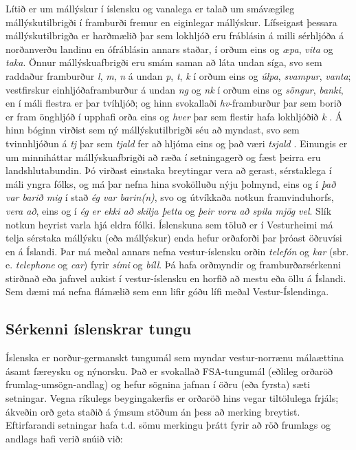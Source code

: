 \documentclass{../../metanetpaper}
\begin{document}
\begin{multicols}{2}
Lítið er um mállýskur í íslensku og vanalega er talað um smávægileg mállýskutilbrigði í framburði fremur en eiginlegar mállýskur. Lífseigast þessara mállýskutilbrigða er harðmælið þar sem lokhljóð eru fráblásin á milli sérhljóða á norðanverðu landinu en ófráblásin annars staðar, í orðum eins og \textit{æpa}, \textit{vita} og \textit{taka}. Önnur mállýskuafbrigði eru smám saman að láta undan síga, svo sem raddaður framburður \textit{l}, \textit{m}, \textit{n} á undan \textit{p}, \textit{t}, \textit{k} í orðum eins og \textit{úlpa}, \textit{svampur}, \textit{vanta};  vestfirskur einhljóðaframburður á undan \textit{ng} og \textit{nk} í orðum eins og \textit{söngur}, \textit{banki}, en í máli flestra er þar tvíhljóð; og hinn svokallaði \textit{hv}-framburður þar sem borið er fram önghljóð í upphafi orða eins og \textit{hver} þar sem flestir hafa lokhljóðið \textit{k} \cite{mal1}.  Á hinn bóginn virðist sem ný mállýskutilbrigði séu að myndast, svo sem tvinnhljóðun á \textit{tj} þar sem \textit{tjald} fer að hljóma eins og það væri \textit{tsjald} \cite{tvi1}. Einungis er um minniháttar mállýskuafbrigði að ræða í setningagerð og fæst þeirra eru landshlutabundin. Þó virðast einstaka breytingar vera að gerast, sérstaklega í máli yngra fólks, og má þar nefna hina svokölluðu nýju þolmynd, eins og í \textit{það var barið mig} í stað \textit{ég var barin(n)}, svo og útvíkkaða notkun framvinduhorfs, \textit{vera að}, eins og í \textit{ég er ekki að skilja þetta} og \textit{þeir voru að spila mjög vel}. Slík notkun heyrist varla hjá eldra fólki. Íslenskuna sem töluð er í Vesturheimi má telja sérstaka mállýsku (eða mállýskur) enda hefur orðaforði þar þróast öðruvísi en á Íslandi. Þar má meðal annars nefna vestur-íslensku orðin \textit{telefón} og \textit{kar} (sbr. e. \textit{telephone} og \textit{car}) fyrir \textit{sími} og \textit{bíll}. Þá hafa orðmyndir og framburðarsérkenni stirðnað eða jafnvel aukist í vestur-íslensku en horfið að mestu eða öllu á Íslandi. Sem dæmi má nefna flámælið sem enn lifir góðu lífi meðal Vestur-Íslendinga.

\subsection{Sérkenni íslenskrar tungu}

Íslenska er norður-germanskt tungumál sem myndar vestur-norrænu málaættina ásamt færeysku og nýnorsku. Það er svokallað FSA-tungumál (eðlileg orðaröð frumlag-umsögn-andlag) og hefur sögnina jafnan í öðru (eða fyrsta) sæti setningar. Vegna ríkulegs beygingakerfis er orðaröð hins vegar tiltölulega frjáls; ákveðin orð geta staðið á ýmsum stöðum án þess að merking breytist. Eftirfarandi setningar hafa t.d. sömu merkingu þrátt fyrir að röð frumlags og andlags hafi verið snúið við:


\end{multicols}
\end{document}
